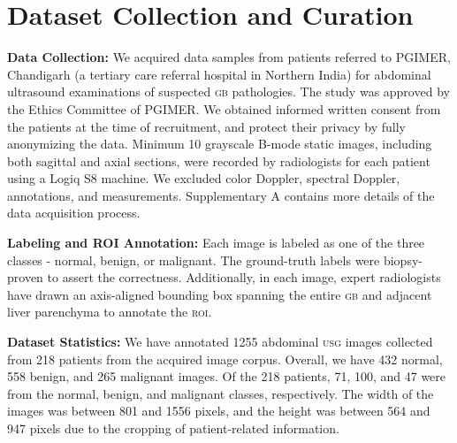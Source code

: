 \documentclass[10pt,twocolumn,letterpaper]{article}
\def\usg{\textsc{usg}\xspace}
\def\gb{\textsc{gb}\xspace}
\def\roi{\textsc{roi}\xspace}
\newcommand{\myfirstpara}[1]{\noindent \textbf{#1:}}
\newcommand{\mypara}[1]{\vspace{0.1em} \myfirstpara{#1}}
\begin{document}
 \section{Dataset Collection and Curation}

\myfirstpara{Data Collection}
We acquired data samples from patients referred to PGIMER, Chandigarh (a tertiary care referral hospital in Northern India) for abdominal ultrasound examinations of suspected \gb pathologies. The study was approved by the Ethics Committee of PGIMER. We obtained informed written consent from the patients at the time of recruitment, and protect their privacy by fully anonymizing the data. Minimum 10 grayscale B-mode static images, including both sagittal and axial sections, were recorded by radiologists for each patient using a Logiq S8 machine. We excluded color Doppler, spectral Doppler, annotations, and measurements. Supplementary A contains more details of the data acquisition process.

\mypara{Labeling and ROI Annotation}
Each image is labeled as one of the three classes - normal, benign, or malignant. The ground-truth labels were biopsy-proven to assert the correctness. Additionally, in each image, expert radiologists have drawn an axis-aligned bounding box spanning the entire \gb and adjacent liver parenchyma to annotate the \roi. 

\mypara{Dataset Statistics}
We have annotated 1255 abdominal \usg images collected from 218 patients from the acquired image corpus. Overall, we have 432 normal, 558 benign, and 265 malignant images. Of the 218 patients, 71, 100, and 47 were from the normal, benign, and malignant classes, respectively. The width of the images was between 801 and 1556 pixels, and the height was between 564 and 947 pixels due to the cropping of patient-related information. 
\end{document}
